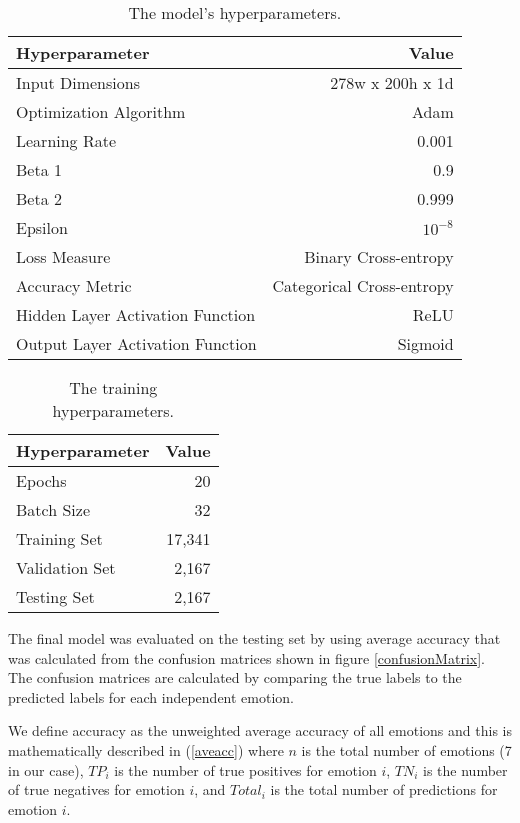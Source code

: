 \begin{table}
	\centering
	\caption{The model's hyperparameters.}
	\label{modelHyperparams}
	\begin{tabular}{@{}lr@{}}
		\toprule
		Hyperparameter & Value \\
		\midrule
		Input Dimensions & 278w x 200h x 1d \\
		Optimization Algorithm & Adam \\
		Learning Rate & 0.001 \\
		Beta 1 & 0.9 \\
		Beta 2 & 0.999 \\
		Epsilon & $10^{-8}$ \\
		Loss Measure & Binary Cross-entropy \\
		Accuracy Metric & Categorical Cross-entropy \\
		Hidden Layer Activation Function & ReLU \\
		Output Layer Activation Function & Sigmoid \\
		\bottomrule
	\end{tabular}
\end{table}

\begin{table}
	\centering
	\caption{The training hyperparameters.}
	\label{trainHyperparams}
	\begin{tabular}{@{}lr@{}}
		\toprule
		Hyperparameter & Value \\
		\midrule
		Epochs & 20 \\
		Batch Size & 32 \\
		Training Set & 17,341 \\
		Validation Set & 2,167 \\
		Testing Set & 2,167 \\
		\bottomrule
	\end{tabular}
\end{table}

The final model was evaluated on the testing set by using average accuracy that was calculated from the confusion matrices shown in figure \ref{confusionMatrix}. The confusion matrices are calculated by comparing the true labels to the predicted labels for each independent emotion.

We define accuracy as the unweighted average accuracy of all emotions and this is mathematically described in (\ref{aveacc}) where $n$ is the total number of emotions (7 in our case), $TP_{i}$ is the number of true positives for emotion $i$, $TN_{i}$ is the number of true negatives for emotion $i$, and $Total_{i}$ is the total number of predictions for emotion $i$.


